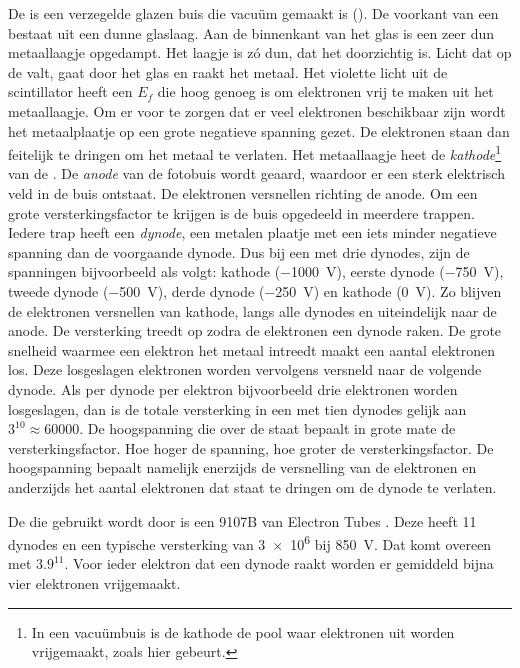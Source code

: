 De \pmt is een verzegelde glazen buis die vacuüm gemaakt
is ().  De voorkant van een \pmt bestaat uit een dunne
glaslaag.  Aan de binnenkant van het glas is een zeer dun metaallaagje
opgedampt.  Het laagje is zó dun, dat het doorzichtig is.  Licht dat op de
\pmt valt, gaat door het glas en raakt het metaal.  Het violette licht uit
de scintillator heeft een $E_f$ die hoog genoeg is om elektronen vrij te
maken uit het metaallaagje.  Om er voor te zorgen dat er veel elektronen
beschikbaar zijn wordt het metaalplaatje op een grote negatieve spanning
gezet.  De elektronen staan dan feitelijk te dringen om het metaal te
verlaten.  Het metaallaagje heet de \emph{kathode}\footnote{In een
vacuümbuis is de kathode de pool waar elektronen uit worden vrijgemaakt,
zoals hier gebeurt.} van de \pmt.  De \emph{anode} van de fotobuis wordt
geaard, waardoor er een sterk elektrisch veld in de buis ontstaat.  De
elektronen versnellen richting de anode.  Om een grote versterkingsfactor
te krijgen is de buis opgedeeld in meerdere trappen.  Iedere trap heeft
een \emph{dynode}, een metalen plaatje met een iets minder negatieve
spanning dan de voorgaande dynode.  Dus bij een \pmt met drie dynodes,
zijn de spanningen bijvoorbeeld als volgt: kathode (\SI{-1000}{\volt}),
eerste dynode (\SI{-750}{\volt}), tweede dynode (\SI{-500}{\volt}), derde
dynode (\SI{-250}{\volt}) en kathode (\SI{0}{\volt}).  Zo blijven de
elektronen versnellen van kathode, langs alle dynodes en uiteindelijk naar
de anode.  De versterking treedt op zodra de elektronen een dynode raken.
De grote snelheid waarmee een elektron het metaal intreedt maakt een
aantal elektronen los.  Deze losgeslagen elektronen worden vervolgens
versneld naar de volgende dynode.  Als per dynode per elektron
bijvoorbeeld drie elektronen worden losgeslagen, dan is de totale
versterking in een \pmt met tien dynodes gelijk aan $3^{10} \approx
\num{60000}$.  De hoogspanning die over de \pmt staat bepaalt in grote
mate de versterkingsfactor.  Hoe hoger de spanning, hoe groter de
versterkingsfactor.  De hoogspanning bepaalt namelijk enerzijds de
versnelling van de elektronen en anderzijds het aantal elektronen dat
staat te dringen om de dynode te verlaten.

De \pmt die gebruikt wordt door \hisparc is een 9107B van Electron
Tubes \cite{9107B}.  Deze heeft 11 dynodes en een typische versterking van
\num{3e6} bij \SI{850}{\volt}.  Dat komt overeen met $\num{3.9}^{11}$.  Voor
ieder elektron dat een dynode raakt worden er gemiddeld bijna vier
elektronen vrijgemaakt.


